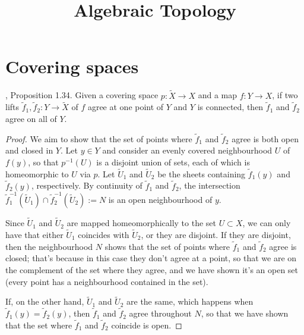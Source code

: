 



\title{Algebraic Topology}
\maketitle

\label{section-phantom}

\tableofcontents

\section{Covering spaces}
\label{section-covering-spaces}
 
\begin{proposition}
\label{proposition-unique-lifting-property}
\cite{hat}, Proposition 1.34. Given a
covering space $p:\tilde{X} \to X$ and a
map $f:Y \to X$, if two lifts
$\tilde{f}_1,\tilde{f}_2:Y \to \tilde{X}$ of
$f$
agree at one point of $Y$ and $Y$ is
connected, then $\tilde{f}_1$ and
$\tilde{f}_2$ agree on all of $Y$.
\end{proposition}

\begin{proof}
We aim to show that the set of points where
$\tilde{f}_1$ and $\tilde{f}_2$
agree is both open and closed in $Y$. Let $y
\in Y$ and consider an evenly
covered neighbourhood $U$ of $f(y)$, so that
$p^{-1}(U)$ is a disjoint union of
sets, each of which is homeomorphic to $U$
via $p$. Let $\tilde{U}_1$ and
$\tilde{U}_2$ be the sheets containing
$\tilde{f}_1(y)$ and $\tilde{f}_2(y)$,
respectively. By continuity of $\tilde{f}_1$
and $\tilde{f}_2$, the intersection
$\tilde{f}^{-1}_1(\tilde{U}_1) \cap
\tilde{f}_2^{-1}(\tilde{U}_2):=N$ is
 an open neighbourhood of $y$.

Since  $\tilde{U}_1$ and $\tilde{U}_2$ are
mapped homeomorphically to the set
$U \subset X$, we can only have that either
$\tilde{U}_1$ coincides
with $\tilde{U}_2$, or they are disjoint. If
they are disjoint, then the
neighbourhood $N$ shows that the set of
points where $\tilde{f}_1$ and
$\tilde{f}_2$ agree is closed; that's because
in this case they don't agree at a
point, so that we are on the complement of
the set where they agree, and we have
shown it's an open set (every point has a
neighbourhood contained in the set).

If, on the other hand, $\tilde{U}_1$ and
$\tilde{U}_2$ are the same, which
happens when $\tilde{f}_1(y)=\tilde{f}_2(y)$,
then $\tilde{f}_1$ and
$\tilde{f}_2$ agree throughout $N$, so that
we have shown that the set where
$\tilde{f}_1$ and $\tilde{f}_2$ coincide is
open.
\end{proof}

